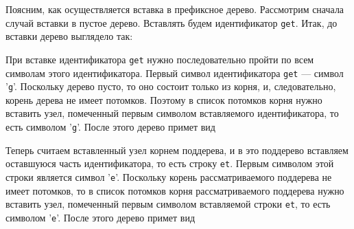 \documentclass[10pt]{report}
\begin{document}
Поясним, как осуществляется вставка в префиксное дерево. Рассмотрим сначала случай вставки в пустое дерево. Вставлять будем идентификатор \texttt{get}. Итак, до вставки дерево выглядело так:
\begin{center}
{}
\end{center}
При вставке идентификатора \texttt{get} нужно последовательно пройти по всем символам этого идентификатора. Первый символ идентификатора \texttt{get} --- символ '\texttt{g}'. Поскольку дерево пусто, то оно состоит только из корня, и, следовательно, корень дерева не имеет потомков. Поэтому в список потомков корня нужно вставить узел, помеченный первым символом вставляемого идентификатора, то есть символом '\texttt{g}'. После этого дерево примет вид
\begin{center}
{}
\end{center}
Теперь считаем вставленный узел корнем поддерева, и в это поддерево вставляем оставшуюся часть идентификатора, то есть строку \texttt{et}. Первым символом этой строки является символ '\texttt{e}'. Поскольку корень рассматриваемого поддерева не имеет потомков, то в список потомков корня рассматриваемого поддерева нужно вставить узел, помеченный первым символом вставляемой строки \texttt{et}, то есть символом '\texttt{e}'. После этого дерево примет вид
\end{document}
